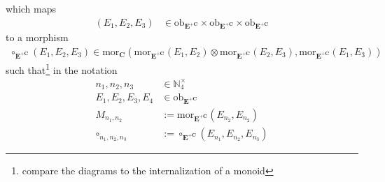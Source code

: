 which maps
\begin{align*}
  (E_{1},E_{2},E_{3})
  &\in
  \mathrm{ob}_{\mathbf{E}^{+\mathbf{C}}}
  \times
  \mathrm{ob}_{\mathbf{E}^{+\mathbf{C}}}
  \times
  \mathrm{ob}_{\mathbf{E}^{+\mathbf{C}}}
\end{align*}
to a morphism
\begin{align*}
  \circ_{\mathbf{E}^{+\mathbf{C}}}(E_{1},E_{2},E_{3})
  \in
  \mathrm{mor}_{\mathbf{C}}
  \left(
    \mathrm{mor}_{\mathbf{E}^{+\mathbf{C}}}(E_{1},E_{2})
    \otimes
    \mathrm{mor}_{\mathbf{E}^{+\mathbf{C}}}(E_{2},E_{3}),
    \mathrm{mor}_{\mathbf{E}^{+\mathbf{C}}}(E_{1},E_{3})
  \right)
\end{align*}
such that\footnote{compare the diagrams to the internalization of a monoid} in the notation
\begin{align*}
  n_{1},
  n_{2},
  n_{3}
  &\in
  \mathbb{N}_{4}^{\times}
  \\
  E_{1},
  E_{2},
  E_{3},
  E_{4}
  &\in
  \mathrm{ob}_{\mathbf{E}^{+\mathbf{C}}}
  \\
  M_{n_{1},n_{2}}
  &:=
  \mathrm{mor}_{\mathbf{E}^{+\mathbf{C}}}(E_{n_{2}},E_{n_{2}})
  \\
  \circ_{n_{1},n_{2},n_{3}}
  &:=
  \circ_{\mathbf{E}^{+\mathbf{C}}}(E_{n_{1}},E_{n_{2}},E_{n_{3}})
\end{align*}
